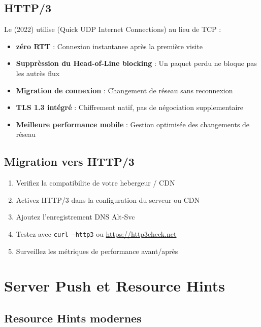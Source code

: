 \subsection{HTTP/3}

Le  (2022) utilise  (Quick UDP Internet Connections) au lieu de TCP :

\begin{itemize}
    \item \textbf{zéro RTT} : Connexion instantanee après la première visite
    \item \textbf{Supprèssion du Head-of-Line blocking} : Un paquet perdu ne bloque pas les autrès flux
    \item \textbf{Migration de connexion} : Changement de réseau sans reconnexion
    \item \textbf{TLS 1.3 intégré} : Chiffrement natif, pas de négociation supplementaire
    \item \textbf{Meilleure performance mobile} : Gestion optimisée des changements de réseau
\end{itemize}


\subsection{Migration vers HTTP/3}

\begin{enumerate}
    \item Verifiez la compatibilite de votre hebergeur / CDN
    \item Activez HTTP/3 dans la configuration du serveur ou CDN
    \item Ajoutez l'enregistrement DNS Alt-Svc
    \item Testez avec \texttt{curl --http3} ou \url{https://http3check.net}
    \item Surveillez les métriques de performance avant/après
\end{enumerate}

\section{Server Push et Resource Hints}

\subsection{Resource Hints modernes}

